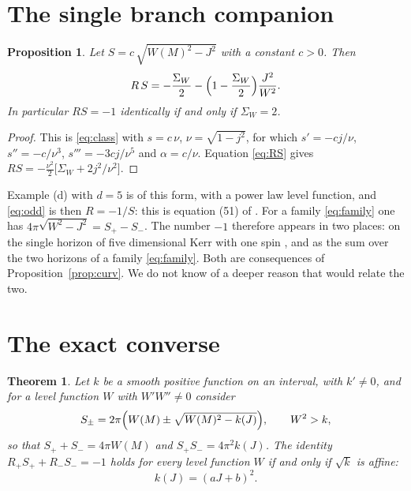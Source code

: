 \documentclass[11pt]{article}
\newtheorem{theorem}{Theorem}
\newtheorem{proposition}{Proposition}
\theoremstyle{definition}
\theoremstyle{remark}
\newcommand{\SW}{\Sigma_{W}}
\begin{document}
\section{The single branch companion}\label{sec:odd}

\begin{proposition}\label{prop:odd}
Let $S=c\,\sqrt{W(M)^{2}-J^{2}}$ with a constant $c>0$. Then
\begin{equation}\label{eq:odd}
R\,S=-\frac{\SW}{2}-\Bigl(1-\frac{\SW}{2}\Bigr)\frac{J^{2}}{W^{2}} .
\end{equation}
In particular $RS=-1$ identically if and only if $\SW=2$.
\end{proposition}

\begin{proof}
This is \eqref{eq:class} with $s=c\,\nu$, $\nu=\sqrt{1-j^{2}}$, for which $s'=-cj/\nu$, $s''=-c/\nu^{3}$, $s'''=-3cj/\nu^{5}$ and $\alpha=c/\nu$. Equation \eqref{eq:RS} gives $RS=-\tfrac{\nu^{2}}{2}\bigl[\SW+2j^{2}/\nu^{2}\bigr]$.
\end{proof}

Example (d) with $d=5$ is of this form, with a power law level function, and \eqref{eq:odd} is then $R=-1/S$: this is equation (51) of \cite{AP06}. For a family \eqref{eq:family} one has $4\pi\sqrt{W^{2}-J^{2}}=S_{+}-S_{-}$. The number $-1$ therefore appears in two places: on the single horizon of five dimensional Kerr with one spin \cite{AP06}, and as the sum over the two horizons of a family \eqref{eq:family}. Both are consequences of Proposition~\ref{prop:curv}. We do not know of a deeper reason that would relate the two.

\section{The exact converse}\label{sec:converse}

\begin{theorem}\label{thm:converse}
Let $k$ be a smooth positive function on an interval, with $k'\neq0$, and for a level function $W$ with $W'W''\neq0$ consider
\begin{equation}\label{eq:kclass}
S_{\pm}=2\pi\Bigl(W(M)\pm\sqrt{W(M)^{2}-k(J)}\Bigr),\qquad W^{2}>k ,
\end{equation}
so that $S_{+}+S_{-}=4\pi W(M)$ and $S_{+}S_{-}=4\pi^{2}k(J)$. The identity $R_{+}S_{+}+R_{-}S_{-}=-1$ holds for every level function $W$ if and only if $\sqrt k$ is affine:
\begin{equation}\label{eq:affine}
k(J)=(aJ+b)^{2} .
\end{equation}
\end{theorem}
\end{document}
